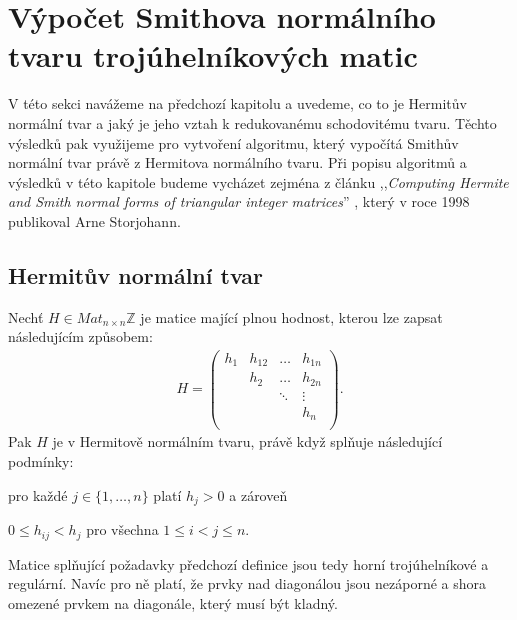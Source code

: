 \chapter{Výpočet Smithova normálního tvaru trojúhelníkových matic}

V této sekci navážeme na předchozí kapitolu a uvedeme, co to je Hermitův normální
tvar a jaký je jeho vztah k redukovanému schodovitému tvaru.
Těchto výsledků pak využijeme pro vytvoření algoritmu, který vypočítá
Smithův normální tvar právě z Hermitova normálního tvaru.
Při popisu algoritmů a výsledků v této kapitole budeme vycházet zejména z článku
,,\textit{Computing Hermite and Smith normal forms of triangular integer matrices}''
\cite{SNF_Arne}, který v roce 1998 publikoval Arne Storjohann.


\section{Hermitův normální tvar}

\begin{defi}\label{hermi}
    Nechť $ H \in Mat_{n \times n}\mathbb{Z} $ je matice mající plnou hodnost,
    kterou lze zapsat následujícím způsobem:
    \begin{align}
        H =
        \begin{pmatrix}
            h_1 & h_{12} & \hdots & h_{1n} \\
                & h_2    & \hdots & h_{2n} \\
                &        & \ddots & \vdots \\
                &        &        & h_n    \\
        \end{pmatrix}.
    \end{align}
    Pak $ H $ je v Hermitově normálním tvaru, právě když splňuje následující
    podmínky:
    \begin{CondNum}
        \item pro každé $ j \in \{1,\dots, n\}$ platí $ h_j > 0 $ a zároveň
        \item $ 0 \leq h_{ij} < h_j $ pro všechna $ 1 \leq i < j \leq n $.
    \end{CondNum}
\end{defi}
\begin{pozn}
    Matice splňující požadavky předchozí definice jsou tedy horní trojúhelníkové
    a regulární. Navíc pro ně platí, že prvky nad diagonálou jsou nezáporné a
    shora omezené prvkem na diagonále, který musí být kladný.
\end{pozn}

